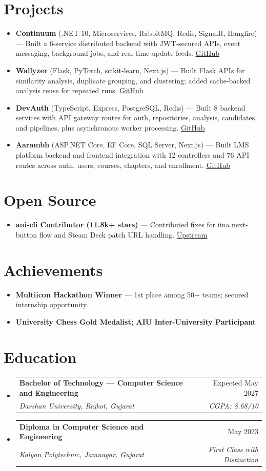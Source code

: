 \documentclass[11pt,a4paper]{article}
\makeatletter
\newcommand{\resumeSubheading}[4]{
  \vspace{-1pt}\item
    \begin{tabular*}{0.97\textwidth}[t]{l@{\extracolsep{\fill}}r}
      \textbf{#1} & #2 \\
      \textit{#3} & \textit{#4} \\
    \end{tabular*}\vspace{-3pt}
}
\newcommand{\resumeItem}[1]{
  \item\small{#1 \vspace{-1pt}}
}
\makeatother
\begin{document}
\section{Projects}
\begin{itemize}[leftmargin=*]
  \resumeItem{\textbf{Continuum} (.NET 10, Microservices, RabbitMQ, Redis, SignalR, Hangfire) --- Built a 6-service distributed backend with JWT-secured APIs, event messaging, background jobs, and real-time update feeds. \href{https://github.com/Dhairya3391/continuum}{GitHub}}
  \resumeItem{\textbf{Wallyzer} (Flask, PyTorch, scikit-learn, Next.js) --- Built Flask APIs for similarity analysis, duplicate grouping, and clustering; added cache-backed analysis reuse for repeated runs. \href{https://github.com/Dhairya3391/wallyzer}{GitHub}}
  \resumeItem{\textbf{DevAuth} (TypeScript, Express, PostgreSQL, Redis) --- Built 8 backend services with API gateway routes for auth, repositories, analysis, candidates, and pipelines, plus asynchronous worker processing. \href{https://github.com/Dhairya3391/devAuth}{GitHub}}
  \resumeItem{\textbf{Aarambh} (ASP.NET Core, EF Core, SQL Server, Next.js) --- Built LMS platform backend and frontend integration with 12 controllers and 76 API routes across auth, users, courses, chapters, and enrollment. \href{https://github.com/Dhairya3391/Aarambh}{GitHub}}
\end{itemize}

\section{Open Source}
\begin{itemize}[leftmargin=*]
  \resumeItem{\textbf{ani-cli Contributor (11.8k+ stars)} --- Contributed fixes for iina next-button flow and Steam Deck patch URL handling. \href{https://github.com/pystardust/ani-cli}{Upstream}}
\end{itemize}

\section{Achievements}
\begin{itemize}[leftmargin=*]
  \resumeItem{\textbf{Multiicon Hackathon Winner} --- 1st place among 50+ teams; secured internship opportunity}
  \resumeItem{\textbf{University Chess Gold Medalist; AIU Inter-University Participant}}
\end{itemize}

\section{Education}
\begin{itemize}[leftmargin=*]
\resumeSubheading
{Bachelor of Technology --- Computer Science and Engineering}{Expected May 2027}
{Darshan University, Rajkot, Gujarat}{CGPA: 8.68/10}
\resumeSubheading
{Diploma in Computer Science and Engineering}{May 2023}
{Kalyan Polytechnic, Jamnagar, Gujarat}{First Class with Distinction}
\end{itemize}
\end{document}
